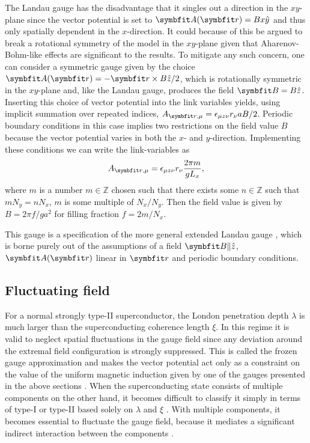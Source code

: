 The Landau gauge has the disadvantage that it singles out a direction in the $xy$-plane since the vector potential is set to $\v{A}(\v{r})=Bx\hat{y}$ and thus only spatially dependent
in the $x$-direction. It could because of this be argued to break a rotational symmetry of the model in the $xy$-plane given that Aharenov-Bohm-like effects are significant to the results.
To mitigate any such concern, one can consider a symmetric gauge given by the choice $\v{A}(\v{r}) = -\v{r}\times B\hat{z}/2$, which is rotationally symmetric in the $xy$-plane
and, like the Landau gauge, produces the field $\v{B} = B\hat{z}$.
Inserting this choice of vector potential into the link variables yields, using implicit summation over repeated indices,
$A_{\v{r},\mu} = \epsilon_{\mu z\nu}r_\nu aB/2$. Periodic boundary conditions in this case implies
two restrictions on the field value $B$ because the vector potential varies in both the $x$- and $y$-direction. Implementing these conditions we can write the link-variables as
\begin{equation}
    \label{eq:LM:Field:symmGaugeLinks}
    A_{\v{r},\mu} = \epsilon_{\mu z\nu}r_\nu\frac{2\pi m}{gL_x},
\end{equation}
where $m$ is a number $m\in\mathbb{Z}$ chosen such that there exists some $n\in\mathbb{Z}$ such that $mN_y=nN_x$, \ie $m$ is some multiple of $N_x/N_y$.
Then the field value is given by $B = 2\pi f/ga^2$ for filling fraction $f=2m/N_x$.

This gauge is a specification of the more general extended Landau gauge \cite{Nguyen99PRB,Nguyen99EPL}, which is borne purely out of the assumptions of a field $\v{B}\|\hat{z}$,
$\v{A}(\v{r})$ linear in $\v{r}$ and
periodic boundary conditions.

\subsection{Fluctuating field}

For a normal strongly type-II superconductor, the London penetration depth $\lambda$ is much larger than the superconducting coherence length $\xi$. In this regime it is valid to neglect
spatial fluctuations in the gauge field since any deviation around the extremal field configuration is strongly suppressed. This is called the frozen gauge approximation and
makes the vector potential act only as a constraint on the value of the uniform magnetic induction given by one of the gauges presented in the above sections \cite{Nguyen99PRB}.
When the superconducting state consists of multiple components on the other hand, it becomes difficult to classify it simply in terms of type-I or type-II based solely on
$\lambda$ and $\xi$ \cite{Babaev05}.
With multiple components, it becomes essential to fluctuate the gauge field, because it mediates a significant indirect interaction between the components \cite{Smorgrav05, Smiseth04}.

